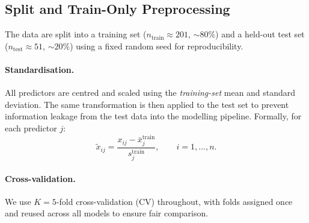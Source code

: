 \begin{table}[H]
\centering
\caption{Descriptive statistics of retained predictors (training set).}
\label{tab:summary-stats}
% 
%
\end{table}

\subsection{Split and Train-Only Preprocessing}
\label{sec:split-preprocess}

The data are split into a training set ($n_{\mathrm{train}} \approx 201$,
$\sim 80\%$) and a held-out test set ($n_{\mathrm{test}} \approx 51$,
$\sim 20\%$) using a fixed random seed for reproducibility.


\paragraph{Standardisation.}
All predictors are centred and scaled using the \emph{training-set} mean and
standard deviation.  The same transformation is then applied to the test set to
prevent information leakage from the test data into the modelling pipeline.
Formally, for each predictor $j$:
\[
    \tilde{x}_{ij}
    = \frac{x_{ij} - \bar{x}_j^{\mathrm{train}}}
           {s_j^{\mathrm{train}}},
    \qquad i = 1, \dots, n.
\]

\paragraph{Cross-validation.}
We use $K = 5$-fold cross-validation (CV) throughout, with folds assigned once
and reused across all models to ensure fair comparison.


